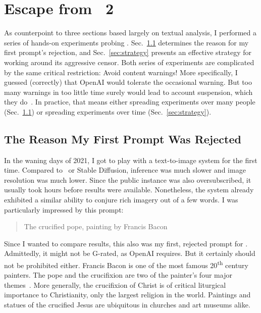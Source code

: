 
\section{Escape from \DALLE~2}
\label{sec:escape}

As counterpoint to three sections based largely on textual analysis, I performed
a series of hands-on experiments probing \DALLE. Sec.\ \ref{sec:crucifixion}
determines the reason for my first prompt's rejection, and Sec.\
\ref{sec:strategy} presents an effective strategy for working around its
aggressive censor. Both series of experiments are complicated by the same
critical restriction: Avoid content warnings! More specifically, I guessed
(correctly) that OpenAI would tolerate the occasional warning. But too many
warnings in too little time surely would lead to account suspension, which they
do~\cite{SpicyElephant2022}. In practice, that means either spreading
experiments over many people (Sec.\ \ref{sec:crucifixion}) or spreading
experiments over time (Sec.\ \ref{sec:strategy}).


\subsection{The Reason My First Prompt Was Rejected}
\label{sec:crucifixion}

In the waning days of 2021, I got to play with a text-to-image system for the
first time. Compared to \DALLE\ or Stable Diffusion, inference was much slower
and image resolution was much lower. Since the public instance was also
oversubscribed, it usually took hours before results were available.
Nonetheless, the system already exhibited a similar ability to conjure rich
imagery out of a few words. I was particularly impressed by this prompt:

\begin{quote}
\openfat{}The crucified pope, painting by Francis Bacon\closefat{}
\end{quote}

\noindent{}Since I wanted to compare results, this also was my first, rejected
prompt for \DALLE. Admittedly, it might not be G-rated, as OpenAI requires. But
it certainly should not be prohibited either. Francis Bacon is one of the most
famous 20\textsuperscript{th} century painters. The pope and the crucifixion are
two of the painter's four major themes~\cite{Wikipedia2023}. More generally, the
crucifixion of Christ is of critical liturgical importance to Christianity, only
the largest religion in the world. Paintings and statues of the crucified Jesus
are ubiquitous in churches and art museums alike.

